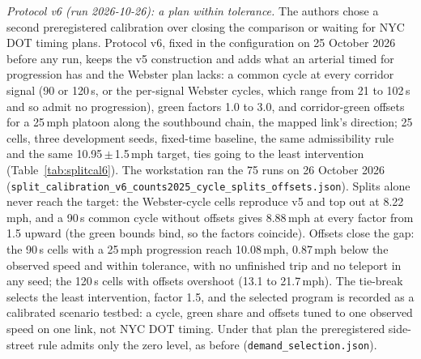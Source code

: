 \textit{Protocol v6 (run 2026-10-26): a plan within tolerance.} The authors chose a second preregistered calibration
over closing the comparison or waiting for NYC DOT timing plans. Protocol v6, fixed in the configuration on 25 October
2026 before any run, keeps the v5 construction and adds what an arterial timed for progression has and the Webster plan
lacks: a common cycle at every corridor signal (90 or 120\,s, or the per-signal Webster cycles, which range from 21 to
102\,s and so admit no progression), green factors 1.0 to 3.0, and corridor-green offsets for a 25\,mph platoon along
the southbound chain, the mapped link's direction; 25 cells, three development seeds, fixed-time baseline, the same
admissibility rule and the same 10.95\,$\pm$\,1.5\,mph target, ties going to the least intervention
(Table~\ref{tab:splitcal6}). The workstation ran the 75 runs on 26 October 2026
(\texttt{split\_calibration\_v6\_counts2025\_cycle\_splits\_offsets.json}). Splits alone never reach the target: the
Webster-cycle cells reproduce v5 and top out at 8.22\,mph, and a 90\,s common cycle without offsets gives 8.88\,mph at
every factor from 1.5 upward (the green bounds bind, so the factors coincide). Offsets close the gap: the 90\,s cells
with a 25\,mph progression reach 10.08\,mph, 0.87\,mph below the observed speed and within tolerance, with no
unfinished trip and no teleport in any seed; the 120\,s cells with offsets overshoot (13.1 to 21.7\,mph). The
tie-break selects the least intervention, factor 1.5, and the selected program is recorded as a calibrated scenario
testbed: a cycle, green share and offsets tuned to one observed speed on one link, not NYC DOT timing. Under that plan
the preregistered side-street rule admits only the zero level, as before (\texttt{demand\_selection.json}).

